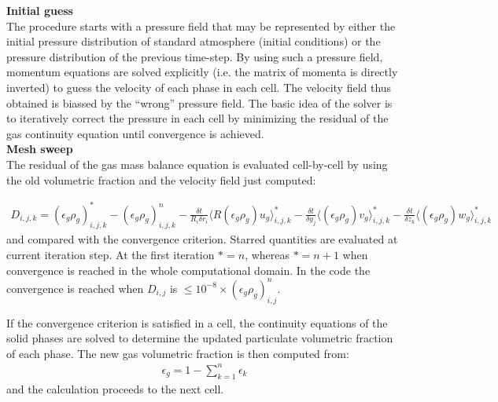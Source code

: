 {\bf Initial guess}\\
The procedure starts with a pressure field that may be represented
by either the initial pressure distribution of standard atmosphere (initial
conditions) or the pressure distribution of the previous time-step.
By using such a pressure field, momentum equations are solved explicitly 
(i.e. the matrix of momenta is directly inverted) to guess the velocity 
of each phase in each cell. The velocity field thus obtained is
biassed by the ``wrong'' pressure field. The basic idea of the solver is
to iteratively correct the pressure in each cell by minimizing the residual
of the gas continuity equation until convergence is achieved.\\

%
{\bf Mesh sweep}\\
The residual of the gas mass balance equation is evaluated cell-by-cell
by using the old volumetric fraction and the velocity field just computed: 

\begin{eqnarray}
D_{i,j,k} =  (\epsilon_g \rho_g)_{i,j,k}^{*} - (\epsilon_g \rho_g)_{i,j,k}^{n}
-\frac {\delta t} {R_i \delta r_i} \langle R (\epsilon_g \rho_g) u_g \rangle_{i,j,k}^{*}
- \frac {\delta t} {\delta y_j } \langle (\epsilon_g \rho_g) v_g \rangle_{i,j,k}^{*}
- \frac {\delta t} {\delta z_k } \langle (\epsilon_g \rho_g) w_g \rangle_{i,j,k}^{*}
\nonumber
\end{eqnarray}
%
and compared with the convergence criterion. Starred quantities are evaluated at current
iteration step. At the first iteration $*=n$, whereas $*=n+1$ when convergence is
reached in the whole computational domain.
In the code the convergence is reached when $D_{i,j}$ is $\le 10^{-8} \times 
(\epsilon_g \rho_g)_{i,j}^{n}$. 

If the convergence criterion is satisfied in a cell, the continuity equations of the solid 
phases are solved to determine the updated particulate volumetric fraction of each phase.
The new gas volumetric fraction is then computed from:
%
\begin{eqnarray}
\epsilon_g  = 1 - \sum_{k=1}^{n} \epsilon_{k}
\nonumber
\end{eqnarray}
%
and the calculation proceeds to the next cell.

